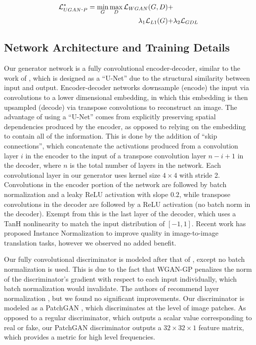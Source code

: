 \documentclass[letterpaper, 10pt, conference]{ieeeconf}
\begin{document}
\begin{equation}
   \begin{aligned}
      \mathcal{L}_{UGAN\scalebox{0.4}[1.0]{\( - \)}P}^* = \min\limits_{G}\max\limits_{D} \mathcal{L}_{WGAN}(G,D) + & \\
      \lambda_{1} \mathcal{L}_{L1}(G) + & \lambda_{2} \mathcal{L}_{GDL}
   \end{aligned}
\end{equation}


\subsection{Network Architecture and Training Details}
Our generator network is a fully convolutional encoder-decoder, similar to the work of \cite{isola2016image}, which is
designed as a ``U-Net'' \cite{ronneberger2015u} due to the structural similarity between input and output.
Encoder-decoder networks downsample (encode) the input via convolutions to a lower dimensional embedding, in which
this embedding is then upsampled (decode) via transpose convolutions to reconstruct an image. The advantage of using
a ``U-Net'' comes from explicitly preserving spatial dependencies produced by the encoder, as opposed to relying on the
embedding to contain all of the information. This is done by the addition of ``skip connections'', which concatenate
the activations produced from a convolution layer $i$ in the encoder to the input of a transpose convolution layer
$n-i+1$ in the decoder, where $n$ is the total number of layers in the network. Each convolutional layer in our
generator uses kernel size $4 \times 4$ with stride 2. Convolutions in the encoder portion of the network are followed
by batch normalization \cite{pmlr-v37-ioffe15} and a leaky ReLU activation with slope $0.2$, while transpose
convolutions in the decoder are followed by a ReLU activation \cite{nair2010rectified} (no batch norm in the decoder).
Exempt from this is the last layer of the decoder, which uses a TanH nonlinearity to match the input distribution of
$[-1, 1]$. Recent work has proposed Instance Normalization \cite{ulyanov2016instance} to improve quality
in image-to-image translation tasks, however we observed no added benefit.

Our fully convolutional discriminator is modeled after that of \cite{radford2015unsupervised}, except no batch
normalization is used. This is due to the fact that WGAN-GP penalizes the norm of the discriminator's gradient with
respect to each input individually, which batch normalization would invalidate. The authors of
\cite{gulrajani2017improved} recommend layer normalization \cite{ba2016layer}, but we found no significant improvements.
Our discriminator is modeled as a PatchGAN \cite{isola2016image,li2016precomputed}, which discriminates at the level of
image patches. As opposed to a regular discriminator, which outputs a scalar value corresponding to real or fake, our
PatchGAN discriminator outputs a $32 \times 32 \times 1$ feature matrix, which provides a metric for high level
frequencies. %
\end{document}
